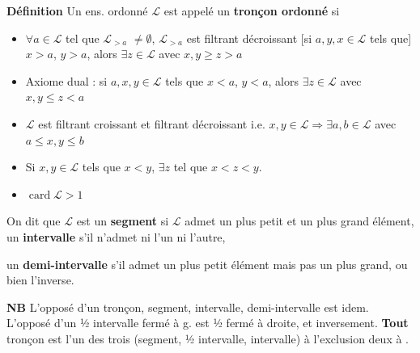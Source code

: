 \documentclass[11pt,a4paper]{article}
\begin{document}


\textbf{Définition} Un ens. ordonné $\mathcal{L}$ est appelé un \textbf{tronçon ordonné} si
\begin{itemize}
  \item[a)] $\forall a \in \mathcal{L}$ tel que $\mathcal{L}_{>a}$ \struck{$=$} $\neq \emptyset$, $\mathcal{L}_{>a}$ est filtrant décroissant  [si $a, y, x \in \mathcal{L}$ tels que] $x > a$, $y > a$, alors $\exists z \in \mathcal{L}$ avec $x, y \geq z > a$
  \item[a')] Axiome dual : si $a, x, y \in \mathcal{L}$ tels que $x < a$, $y < a$, alors $\exists z \in \mathcal{L}$ avec $x, y \leq z < a$
  \item[b)] $\mathcal{L}$ est filtrant croissant et filtrant décroissant i.e. $x, y \in \mathcal{L} \Longrightarrow \exists a, b \in \mathcal{L}$ avec $a \leq x, y \leq b$
  \item[c)] Si $x, y \in \mathcal{L}$ tels que $x < y$, $\exists z$ tel que $x < z < y$. \struck{\ill{}}
  \item[d)] \struck{\ill{}} $\operatorname{card} \mathcal{L} > 1$
\end{itemize}

On dit que $\mathcal{L}$ est un \textbf{segment} si $\mathcal{L}$ admet un plus petit et un plus grand élément, un \textbf{intervalle} s'il n'admet ni l'un ni l'autre,

un \textbf{demi-intervalle} s'il admet un plus petit élément mais pas un plus grand, ou bien l'inverse.


\textbf{NB} L'opposé d'un tronçon, segment, intervalle, demi-intervalle est idem. L'opposé d'un ½ intervalle fermé à g. est ½ fermé à droite, et inversement.  \textbf{Tout} tronçon est l'un des trois (segment, ½ intervalle, intervalle) à l'exclusion \ill{} deux à .
\end{document}
